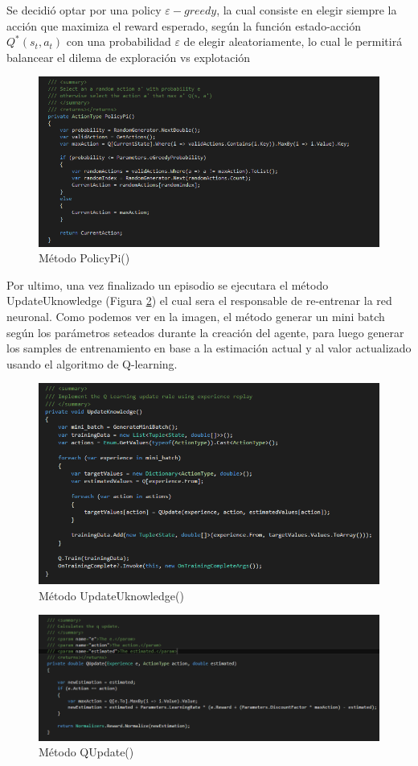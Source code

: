 Se decidió optar por una policy $\varepsilon-greedy$, la cual consiste en elegir siempre la acción que maximiza el reward esperado, según la función estado-acción $Q^*(s_t, a_t)$ con una probabilidad $\varepsilon$ de elegir aleatoriamente, lo cual le permitirá balancear el dilema de exploración vs explotación

\begin{figure}[h!]
	\centering
	\includegraphics[scale=0.5]{imagenes/screen7.png}
	\caption{Método PolicyPi()}
	\label{fig:cap4:6}
\end{figure}

Por ultimo, una vez finalizado un episodio se ejecutara el método UpdateUknowledge (Figura \ref{fig:cap4:7}) el cual sera el responsable de re-entrenar la red neuronal. Como podemos ver en la imagen, el método generar un mini batch según los parámetros seteados durante la creación del agente, para luego generar los samples de entrenamiento en base a la estimación actual y al valor actualizado usando el algoritmo de Q-learning.
\begin{figure}[h!]
	\centering
	\includegraphics[scale=0.7]{imagenes/screen8.png}
	\caption{Método UpdateUknowledge()}
	\label{fig:cap4:7}
\end{figure}

\begin{figure}[h!]
	\centering
	\includegraphics[scale=0.7]{imagenes/screen9.png}
	\caption{Método QUpdate()}
	\label{fig:cap4:8}
\end{figure}